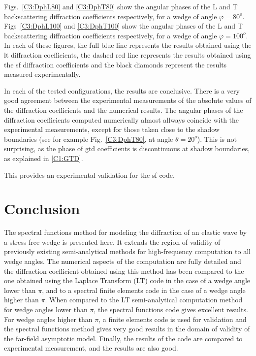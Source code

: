 Figs.~\ref{C3:DphL80} and \ref{C3:DphT80} show the angular phases of the L and T backscattering diffraction coefficients respectively, for a wedge of angle $\varphi=80^o$. Figs~\ref{C3:DphL100} and \ref{C3:DphT100} show the angular phases of the L and T backscattering diffraction coefficients respectively, for a wedge of angle $\varphi=100^o$. In each of these figures, the full blue line represents the results obtained using the \acrshort{lt} diffraction coefficients, the dashed red line represents the results obtained using the \acrshort{sf} diffraction coefficients and the black diamonds represent the results measured experimentally.

In each of the tested configurations, the results are conclusive. There is a very good agreement between the experimental measurements of the absolute values of the diffraction coefficients and the numerical results. The angular phases of the diffraction coefficients computed numerically almost allways coincide with the experimental measurements, except for those taken close to the shadow boundaries (see for example Fig.~\ref{C3:DphT80}, at angle $\theta=20^o$). This is not surprising, as the phase of \acrshort{gtd} coefficients is discontinuous at shadow boundaries, as explained in \ref{C1:GTD}.

This provides an experimental validation for the \acrshort{sf} code.
\newpage

\section*{Conclusion}
The spectral functions method for modeling the diffraction of an elastic wave by a stress-free wedge is presented here. It extends the region of validity of previously existing semi-analytical methods for high-frequency computation to all wedge angles. The numerical aspects of the computation are fully detailed and the diffraction coefficient obtained using this method has been compared to the one obtained using the Laplace Transform (LT) code in the case of a wedge angle lower than $\pi$, and to a spectral finite elements code in the case of a wedge angle higher than $\pi$. 
When compared to the LT semi-analytical computation method for wedge angles lower than $\pi$, the spectral functions code gives excellent results. For wedge angles higher than $\pi$, a finite elements code is used for validation and the spectral functions method gives very good results in the domain of validity of the far-field asymptotic model. Finally, the results of the code are compared to experimental measurement, and the results are also good.

